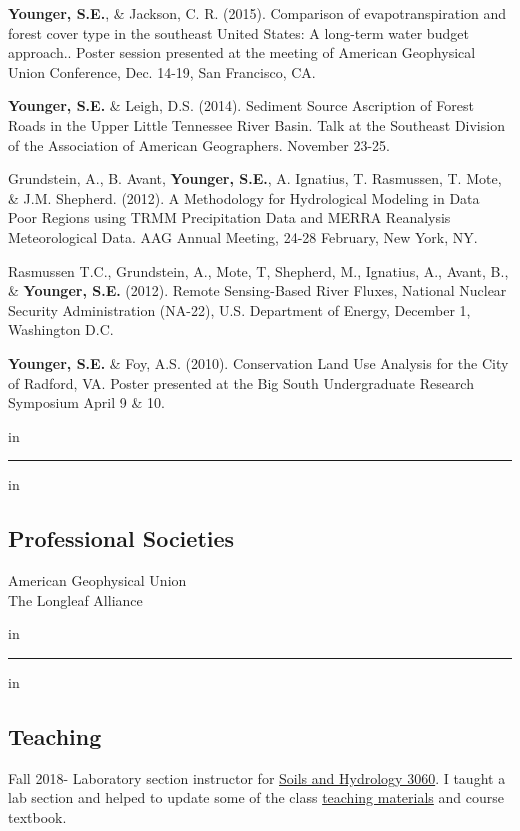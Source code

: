 \documentclass[10pt,letterpaper]{article}
\begin{document}
\begin{hangparas}{.25in}{1}
		\textbf{Younger, S.E.}, \& Jackson, C. R. (2015). Comparison of evapotranspiration and forest cover type in the southeast United States: A long-term water budget approach.. Poster session presented at the meeting of American Geophysical Union Conference, Dec. 14-19, San Francisco, CA.
		
		\textbf{Younger, S.E.} \& Leigh, D.S. (2014). Sediment Source Ascription of Forest Roads in the Upper Little Tennessee River Basin. Talk at the Southeast Division of the Association of American Geographers. November 23-25.
		
		Grundstein, A., B. Avant, \textbf{Younger, S.E.}, A. Ignatius, T. Rasmussen, T. Mote, \& J.M. Shepherd. (2012). A Methodology for Hydrological Modeling in Data Poor Regions using TRMM Precipitation Data and MERRA Reanalysis Meteorological Data. AAG Annual Meeting, 24-28 February, New York, NY.
		
		Rasmussen T.C., Grundstein, A., Mote, T, Shepherd, M., Ignatius, A., Avant, B., \& \textbf{Younger, S.E.} (2012). Remote Sensing-Based River Fluxes, National Nuclear Security Administration (NA-22), U.S. Department of Energy, December 1, Washington D.C.
		
		\textbf{Younger, S.E.} \& Foy, A.S. (2010). Conservation Land Use Analysis for the City of Radford, VA. Poster presented at the Big South Undergraduate Research Symposium April 9 \& 10.
		
	\end{hangparas}
	
	 in
	
	\hrule
	\vspace{-0.4em}
	 in
	\subsection*{Professional Societies}
	
	American Geophysical Union \\
	The Longleaf Alliance
	
	 in
	
	\hrule
	\vspace{-0.4em}
	 in
	\subsection*{Teaching}
	
	Fall 2018- Laboratory section instructor for \href{http://www.hydrology.uga.edu/rasmussen/class/3060/index.html}{Soils and Hydrology 3060}. I taught a lab section and helped to update some of the class \href{https://seyounger.github.io/soils_and_hydro_teaching/}{teaching materials} and course textbook.
	
\end{document}
